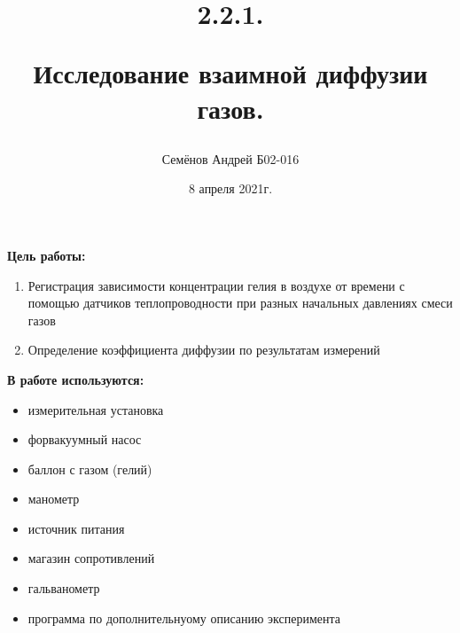 \documentclass[12pt,a4paper]{article}
\begin{document}
\title{
2.2.1.

Исследование взаимной диффузии газов.
\author{Семёнов Андрей Б02-016}
}
\date{8 апреля 2021г.}

\maketitle

\newpage

\textbf{Цель работы:}
\begin{enumerate}
    \item Регистрация зависимости концентрации гелия в воздухе от времени с помощью датчиков теплопроводности при разных начальных давлениях смеси газов
    \item Определение коэффициента диффузии по результатам измерений
\end{enumerate}

\textbf{В работе используются:}
\begin{itemize}
    \item измерительная установка
    \item форвакуумный насос
    \item баллон с газом (гелий)
    \item манометр
    \item источник питания
    \item магазин сопротивлений
    \item гальванометр
    \item программа по дополнительнуому описанию эксперимента
\end{itemize}
\end{document}
